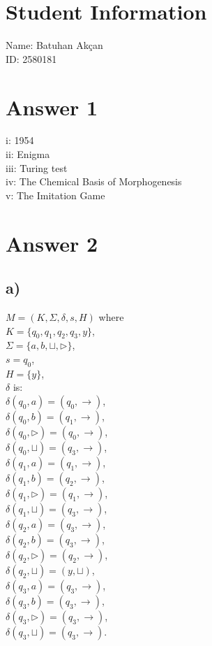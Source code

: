\documentclass{article}
\begin{document}
\section*{Student Information}
Name: Batuhan Akçan \\
ID: 2580181 \\

\section*{Answer 1}
i: 1954\\
ii: Enigma\\
iii: Turing test\\
iv: The Chemical Basis of Morphogenesis\\
v: The Imitation Game

\section*{Answer 2}
\subsection*{a)}
$M = (K, \Sigma, \delta, s, H)$ where\\
$K = \{q_0, q_1, q_2, q_3, y\}$,\\
$\Sigma = \{a,b,\sqcup,\triangleright\}$,\\
$s = q_0$,\\
$H = \{y\}$,\\
$\delta$ is:\\
$\delta(q_0,a) = (q_0,\rightarrow)$,\\
$\delta(q_0,b) = (q_1,\rightarrow)$,\\
$\delta(q_0,\triangleright) = (q_0,\rightarrow)$,\\
$\delta(q_0,\sqcup) = (q_3,\rightarrow)$,\\
$\delta(q_1,a) = (q_1,\rightarrow)$,\\
$\delta(q_1,b) = (q_2,\rightarrow)$,\\
$\delta(q_1,\triangleright) = (q_1,\rightarrow)$,\\
$\delta(q_1,\sqcup) = (q_3,\rightarrow)$,\\
$\delta(q_2,a) = (q_3,\rightarrow)$,\\
$\delta(q_2,b) = (q_3,\rightarrow)$,\\
$\delta(q_2,\triangleright) = (q_2,\rightarrow)$,\\
$\delta(q_2,\sqcup) = (y,\sqcup)$,\\
$\delta(q_3,a) = (q_3,\rightarrow)$,\\
$\delta(q_3,b) = (q_3,\rightarrow)$,\\
$\delta(q_3,\triangleright) = (q_3,\rightarrow)$,\\
$\delta(q_3,\sqcup) = (q_3,\rightarrow).$\\
\end{document}
